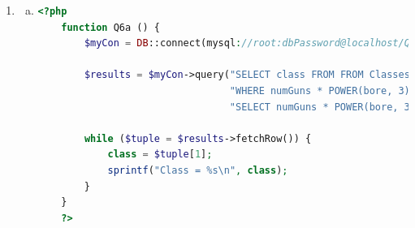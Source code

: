 \documentclass[12pt]{article}
\begin{document}
\begin{enumerate}[1.]
\begin{enumerate}[a)]
\begin{lstlisting}[language=PHP]
        echo("Enter hd:");
        $hd = fscanf(STDIN, "%d\n");

        echo("Enter price:");
        $price = fscanf(STDIN, "%f\n");

        $execStat = $myCon->prepare("SELECT Product.model AS m1, PC.model AS m2 FROM " +
                                    "Product FULL OUTER JOIN PC" +
                                    "WHERE model = ?");
            $args = array(model);
        $results = $myCon->execute();

        while ($tuple = $results->fetchRow()) {
            $productModel = $tuple[0];
            $pcModel = $tuple[1];

            if (!is_null($productModel) && !is_null($pcModel)) {
                echo("Error. Model already exists in database.");
            } else {
                $subExecStat = $myCon->prepare(
                    "INSERT INTO PC(model, speed, ram, hd, price) " +
                    "VALUES(?, ?, ?, ?, ?)"
                );
                    $args = array(model, speed, ram, hd, price);
                $myCon->execute($subExecStat, $args);

                $subExecStat = $myCon->statement(
                    "INSERT INTO Product(model, maker, type) " +
                    "VALUES(?, ?, 'pc')"
                );
                    $args = array(model, maker);
                $myCon->execute($subExecStat, $args);
            }

        }
    }

    \end{lstlisting}

    \end{enumerate}

    \item

    \begin{enumerate}[a)]
        \item

    \begin{lstlisting}[language=PHP]
    <?php
    function Q6a () {
        $myCon = DB::connect(mysql://root:dbPassword@localhost/Q6);

        $results = $myCon->query("SELECT class FROM FROM Classes " +
                                 "WHERE numGuns * POWER(bore, 3) >= ALL ( " +
                                 "SELECT numGuns * POWER(bore, 3) FROM Classes)");

        while ($tuple = $results->fetchRow()) {
            class = $tuple[1];
            sprintf("Class = %s\n", class);
        }
    }
    ?>
    \end{lstlisting}


\end{enumerate}
\end{enumerate}
\end{document}
